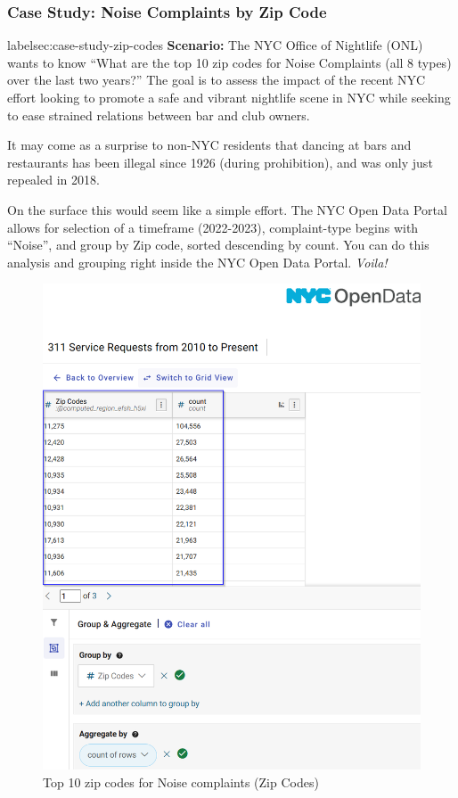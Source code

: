 \documentclass[12pt, titlepage]{article}
\begin{document}
		\subsubsection{Case Study: Noise Complaints by Zip Code}{label{sec:case-study-zip-codes}
		\textbf{Scenario:} The NYC Office of Nightlife (ONL) wants to know ``What are the top 10 zip codes for Noise Complaints (all 8 types) over the last two years?''
		The goal is to assess the impact of the recent NYC effort looking to promote a safe and vibrant nightlife scene in NYC while seeking to ease
		strained relations between bar and club owners. 
		
		It may come as a surprise to non-NYC residents that dancing at bars and restaurants has been illegal since 1926 (during prohibition), and was only just repealed in 2018. 
		
		On the surface this would seem like a simple effort.  The NYC Open Data Portal allows for selection of a timeframe (2022-2023), complaint-type
		begins with ``Noise'', and group by Zip code, sorted descending by count.  You can do this analysis and grouping right inside the NYC Open Data Portal. \textit{Voila!}

	\begin{figure}[H]
	    		\centering
	    		\includegraphics[scale = 0.6]{zipcode_casestudy.png}
	    		\caption{Top 10 zip codes for Noise complaints (Zip Codes)}
	    	\label{fig:casestudy1-zipcodes}
		\end{figure}
	
}
\end{document}
